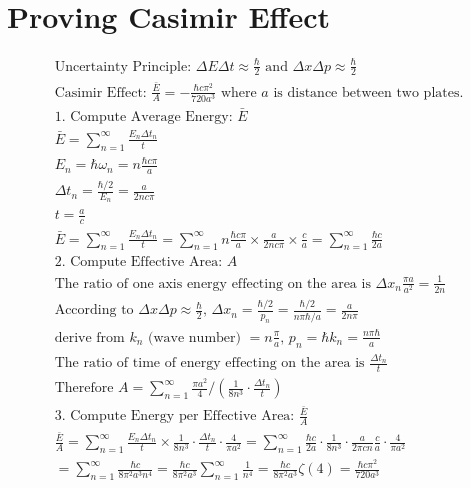 \section{Proving Casimir Effect}
\begin{align*}
&\text{Uncertainty Principle: }\Delta E \Delta t \approx \frac{\hbar}{2} \text{ and } \Delta x \Delta p \approx \frac{\hbar}{2}& \\
&\text{Casimir Effect: } \frac{\bar{E}}{A} = - \frac{\hbar c \pi^2}{720 a^3} \text{ where } a \text{ is distance between two plates.}& \\
&\text{1. Compute Average Energy: }\bar{E}&\\
&\bar{E} = \sum_{n=1}^{\infty}\frac{E_n\Delta t_n}{t}& \\
&E_n = \hbar \omega_n = n \frac{ \hbar c \pi}{a}& \\
&\Delta t_n = \frac{\hbar/2}{E_n} = \frac{a}{2 n c \pi}&\\
&t = \frac{a}{c}&\\
&\bar{E} = \sum_{n=1}^{\infty} \frac{E_n \Delta t_n}{t} = \sum_{n=1}^{\infty} n \frac{ \hbar c \pi}{a} \times \frac{a}{2 n c \pi} \times \frac{c}{a} = \sum_{n=1}^{\infty} \frac{\hbar c }{2 a}&\\
&\text{2. Compute Effective Area: }A& \\
&\text{The ratio of one axis energy effecting on the area is }\Delta x_n \frac{\pi a}{a^2} = \frac{1}{2 n}&\\
&\text{According to }\Delta x \Delta p \approx \frac{\hbar}{2} \text{, }\Delta x_n = \frac{\hbar/2}{p_n} = \frac{\hbar/2}{n \pi \hbar/a} = \frac{a}{2 n \pi}&\\
&\text{derive from } k_n \text{ (wave number) } = n\frac{\pi}{a} \text{, }p_n = \hbar k_n = \frac{n \pi \hbar}{a}& \\
&\text{The ratio of time of energy effecting on the area is } \frac{\Delta t_n}{t}&\\
&\text{Therefore } A = \sum_{n=1}^{\infty} \frac{\pi a^2}{4} /(\frac{1}{8 n^3} \cdot \frac{\Delta t_n}{t})&\\
&\text{3. Compute Energy per Effective Area: }\frac{\bar{E}}{A}&\\
&\frac{\bar{E}}{A} = \sum_{n=1}^{\infty}\frac{ E_n \Delta t_n}{t} \times \frac{1}{8 n^3} \cdot \frac{\Delta t_n}{t} \cdot \frac{4}{\pi a^2}
= \sum_{n=1}^{\infty}\frac{\hbar c}{2 a}\cdot\frac{1}{8 n^3}\cdot\frac{a}{2 \pi c n}\frac{c}{a} \cdot \frac{4}{\pi a^2}&\\
&= \sum_{n=1}^{\infty}\frac{\hbar c}{8 \pi^2 a^3 n^4}
= \frac{\hbar c}{8 \pi^2 a^3}\sum_{n=1}^{\infty}\frac{1}{n^4}
= \frac{\hbar c}{8 \pi^2 a^3} \zeta(4) = \frac{\hbar c \pi^2}{720 a^3}&\\
\\
\end{align*}